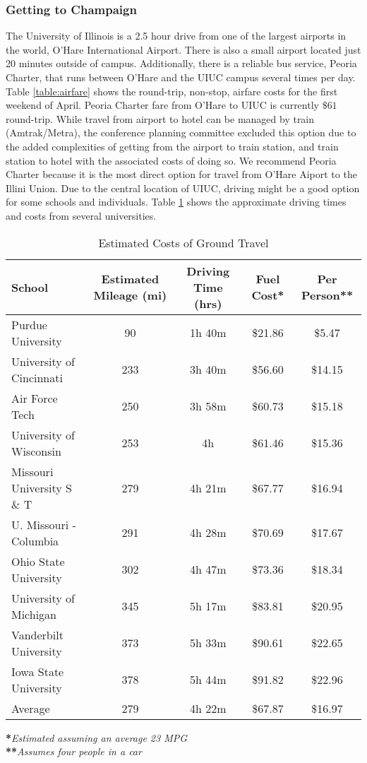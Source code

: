 \subsubsection{Getting to Champaign}
The University of Illinois is a 2.5 hour drive from one of the largest airports in the world, O'Hare International Airport. There is also a small airport located just 20 minutes outside of campus. Additionally, there is a reliable bus service, Peoria Charter, that runs between O'Hare and the UIUC campus several times per day. Table \ref{table:airfare} shows the round-trip, non-stop, airfare costs for the first weekend of April. Peoria Charter fare from O'Hare to UIUC is currently $\$61$ round-trip. While travel from airport to hotel can be managed by train (Amtrak/Metra), the conference planning committee excluded this option due to the added complexities of getting from the airport to train station, and train station to hotel with the associated costs of doing so. We recommend Peoria Charter because it is the most direct option for travel from O'Hare Aiport to the Illini Union. Due to the central location of UIUC, driving might be a good option for some schools and individuals. Table \ref{table:ground} shows the approximate driving times and costs from several universities. 


\begin{table}[H]
\caption{Estimated Costs of Ground Travel}
\label{table:ground}
   \begin{tabular}{lcccc}
   \hline\hline
   \textbf{School}&\textbf{Estimated Mileage (mi)}&\textbf{Driving Time (hrs)}&\textbf{Fuel Cost*}&\textbf{Per Person**}\\
   \hline\hline
    Purdue University&90&1h 40m&\$21.86&\$5.47\\
    University of Cincinnati&233& 3h 40m&\$56.60&\$14.15\\
    Air Force Tech &250&3h 58m&\$60.73&\$15.18\\
    University of Wisconsin&253&4h&\$61.46&\$15.36\\
    Missouri University S \& T &279&4h 21m&\$67.77&\$16.94\\
    U. Missouri - Columbia&291&4h 28m&\$70.69&\$17.67\\
    Ohio State University&302&4h 47m&\$73.36&\$18.34\\
    University of Michigan&345&5h 17m&\$83.81&\$20.95\\
    Vanderbilt University&373&5h 33m&\$90.61&\$22.65\\
    Iowa State University&378&5h 44m&\$91.82&\$22.96\\
    \hline
    Average&279&4h 22m&\$67.87&\$16.97

    \end{tabular} 
\end{table}
\noindent\textbf{*}\textit{Estimated assuming an average 23 MPG}\\
\textbf{**}\textit{Assumes four people in a car}


